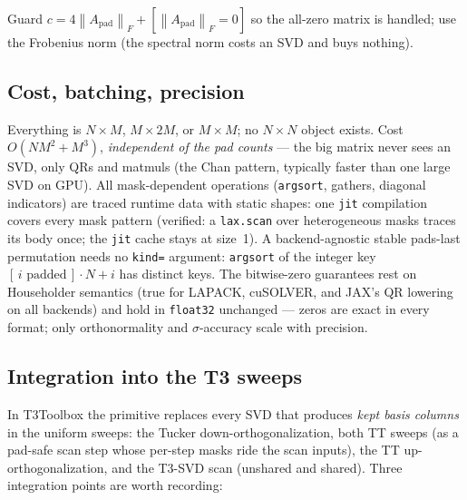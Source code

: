 \documentclass[11pt]{article}
\theoremstyle{definition}
\theoremstyle{remark}
\newcommand{\Apad}{A_{\mathrm{pad}}}
\newcommand{\norm}[1]{\left\lVert #1 \right\rVert}
\newcommand{\code}[1]{\texttt{#1}}
\begin{document}
Guard $c = 4\norm{\Apad}_F + [\norm{\Apad}_F = 0]$ so the all-zero matrix is handled; use the
Frobenius norm (the spectral norm costs an SVD and buys nothing).

\subsection{Cost, batching, precision}\label{sec:cost}

Everything is $N\times M$, $M\times 2M$, or $M\times M$; no $N\times N$ object exists. Cost
$O(NM^2 + M^3)$, \emph{independent of the pad counts} --- the big matrix never sees an SVD, only
QRs and matmuls (the Chan pattern, typically faster than one large SVD on GPU). All mask-dependent
operations (\code{argsort}, gathers, diagonal indicators) are traced runtime data with static
shapes: one \code{jit} compilation covers every mask pattern (verified: a \code{lax.scan} over
heterogeneous masks traces its body once; the \code{jit} cache stays at size~1). A backend-agnostic
stable pads-last permutation needs no \code{kind=} argument: \code{argsort} of the integer key
$[\,i\text{ padded}\,]\cdot N + i$ has distinct keys. The bitwise-zero guarantees rest on
Householder semantics (true for LAPACK, cuSOLVER, and JAX's QR lowering on all backends) and hold
in \code{float32} unchanged --- zeros are exact in every format; only orthonormality and
$\sigma$-accuracy scale with precision.

\subsection{Integration into the T3 sweeps}\label{sec:t3}

In T3Toolbox the primitive replaces every SVD that produces \emph{kept basis columns} in the
uniform sweeps: the Tucker down-orthogonalization, both TT sweeps (as a pad-safe scan step whose
per-step masks ride the scan inputs), the TT up-orthogonalization, and the T3-SVD scan (unshared and shared).
Three integration points are worth recording:
\end{document}
